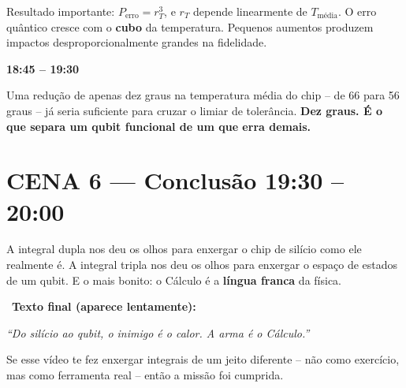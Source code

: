 \documentclass[12pt, a4paper]{article}
\newcommand{\tempo}[1]{%
  \noindent\hfill
  {\small\sffamily\color{corTempo}%
   \faStopwatch\enspace\textbf{#1}}%
  \par\vspace{2pt}%
}
\begin{document}
\begin{fala}
Resultado importante: $P_{\text{erro}} = r_T^3$, e $r_T$ depende linearmente
de $T_{\text{média}}$. O erro quântico cresce com o \textbf{cubo} da temperatura.
Pequenos aumentos produzem impactos desproporcionalmente grandes na fidelidade.
\end{fala}

\tempo{18:45 -- 19:30}

\begin{center}
\end{center}

\begin{fala}
Uma redução de apenas dez graus na temperatura média do chip --
de 66 para 56 graus -- já seria suficiente para cruzar o limiar de tolerância.
\textbf{Dez graus. É o que separa um qubit funcional de um que erra demais.}
\end{fala}

\section{CENA 6 --- Conclusão \hfill \normalfont\small\color{corTempo}19:30 -- 20:00}

\begin{fala}
A integral dupla nos deu os olhos para enxergar o chip de silício como ele
realmente é. A integral tripla nos deu os olhos para enxergar o espaço 
de estados de um qubit. E o mais bonito: o Cálculo é a \textbf{língua franca} da física.
\end{fala}

\begin{tela}
\faDesktop\ \textbf{Texto final (aparece lentamente):}
\begin{center}
\large\itshape
``Do silício ao qubit, o inimigo é o calor. A arma é o Cálculo.''
\end{center}
\end{tela}

\begin{fala}
Se esse vídeo te fez enxergar integrais de um jeito diferente --
não como exercício, mas como ferramenta real -- então a missão foi cumprida.
\end{fala}
\end{document}
